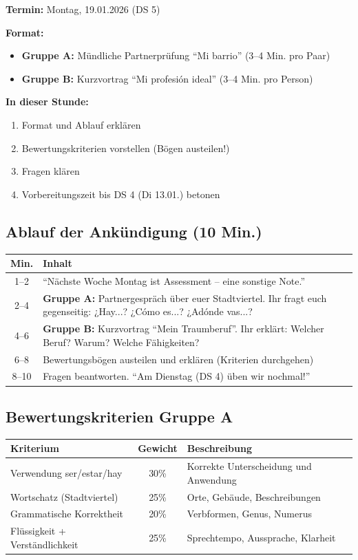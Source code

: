 \documentclass[11pt,a4paper]{article}
\begin{document}
\begin{warnbox}
\textbf{Termin:} Montag, 19.01.2026 (DS 5)

\textbf{Format:}
\begin{itemize}
    \item \textbf{Gruppe A:} Mündliche Partnerprüfung ``Mi barrio'' (3--4 Min. pro Paar)
    \item \textbf{Gruppe B:} Kurzvortrag ``Mi profesión ideal'' (3--4 Min. pro Person)
\end{itemize}

\textbf{In dieser Stunde:}
\begin{enumerate}
    \item Format und Ablauf erklären
    \item Bewertungskriterien vorstellen (Bögen austeilen!)
    \item Fragen klären
    \item Vorbereitungszeit bis DS 4 (Di 13.01.) betonen
\end{enumerate}
\end{warnbox}

\subsection{Ablauf der Ankündigung (10 Min.)}

\begin{tabular}{|c|p{10cm}|}
\hline
\textbf{Min.} & \textbf{Inhalt} \\
\hline
1--2 & ``Nächste Woche Montag ist Assessment -- eine sonstige Note.'' \\
\hline
2--4 & \textbf{Gruppe A:} Partnergespräch über euer Stadtviertel. Ihr fragt euch gegenseitig: ¿Hay...? ¿Cómo es...? ¿Adónde vas...? \\
\hline
4--6 & \textbf{Gruppe B:} Kurzvortrag ``Mein Traumberuf''. Ihr erklärt: Welcher Beruf? Warum? Welche Fähigkeiten? \\
\hline
6--8 & Bewertungsbögen austeilen und erklären (Kriterien durchgehen) \\
\hline
8--10 & Fragen beantworten. ``Am Dienstag (DS 4) üben wir nochmal!'' \\
\hline
\end{tabular}

\subsection{Bewertungskriterien Gruppe A}

\begin{tabular}{|l|c|p{6cm}|}
\hline
\textbf{Kriterium} & \textbf{Gewicht} & \textbf{Beschreibung} \\
\hline
Verwendung ser/estar/hay & 30\% & Korrekte Unterscheidung und Anwendung \\
\hline
Wortschatz (Stadtviertel) & 25\% & Orte, Gebäude, Beschreibungen \\
\hline
Grammatische Korrektheit & 20\% & Verbformen, Genus, Numerus \\
\hline
Flüssigkeit + Verständlichkeit & 25\% & Sprechtempo, Aussprache, Klarheit \\
\hline
\end{tabular}
\end{document}
